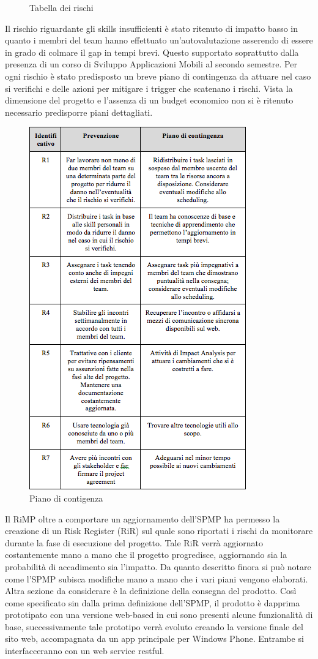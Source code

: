 {\begin{figure}[h]
\caption{Tabella dei rischi}
\label{fig:cd}
\end{figure}
Il rischio riguardante gli skills insufficienti \`{e} stato ritenuto di impatto basso in quanto i membri del team hanno effettuato un\rq autovalutazione asserendo di essere in grado di colmare il gap in tempi brevi. Questo supportato soprattutto dalla presenza di un corso di Sviluppo Applicazioni Mobili al secondo semestre.
Per ogni rischio \`{e} stato predisposto un breve piano di contingenza da attuare nel caso si verifichi e delle azioni per mitigare i trigger che scatenano i rischi. Vista la dimensione del progetto e l\rq assenza di un budget economico non si \`{e} ritenuto necessario predisporre piani dettagliati.
\begin{figure}[h]
\centering
\includegraphics[scale=.6]{img/18.png}
\caption{Piano di contigenza}
\label{fig:cd}
\end{figure}
Il RiMP oltre a comportare un aggiornamento dell’SPMP ha permesso la creazione di un Risk Register (RiR) sul quale sono riportati i rischi da monitorare durante la fase di esecuzione del progetto.
Tale RiR verr\`{a} aggiornato costantemente mano a mano che il progetto progredisce, aggiornando sia la probabilit\`{a} di accadimento sia l\rq impatto.
Da quanto descritto finora si pu\`{o} notare come l’SPMP subisca modifiche mano a mano che i vari piani vengono elaborati. Altra sezione da considerare \`{e} la definizione della consegna del prodotto. Cos\`{i} come specificato sin dalla prima definizione dell’SPMP, il prodotto \`{e} dapprima prototipato con una versione web-based in cui sono presenti alcune funzionalit\`{a} di base, successivamente tale prototipo verr\`{a} evoluto creando la versione finale del sito web, accompagnata da un app principale per Windows Phone. Entrambe si interfacceranno con un web service restful.

}
